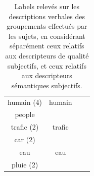 \begin{table}[t]
\begin{tabular}{cc|cc}
humain (4)            & humain                  &                        &  \\  
people                &                         &                        & \\       
\cline{1-2}
trafic (2)            & trafic                  &                        & \\
car (2)               &                         &                        &  \\                   
\cline{1-2}
eau                   & eau                     &                        & \\ 
pluie (2)             &                         &                        & \\
\end{tabular}
\vspace{0.5mm}
\caption{Labels relevés sur les descriptions verbales des groupements effectués par les sujets, en considérant séparément ceux relatifs aux descripteurs de qualité subjectifs, et ceux relatifs aux descripteurs sémantiques subjectifs.}
\label{tab:association}
\end{table}


